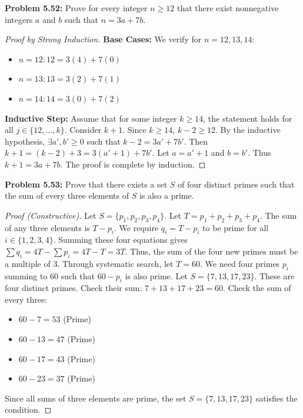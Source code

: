 \documentclass[11pt, a4paper]{article}
\theoremstyle{definition}
\theoremstyle{remark}
\begin{document}
\textbf{Problem 5.52:} Prove for every integer $n \ge 12$ that there exist nonnegative integers $a$ and $b$ such that $n = 3a + 7b$.
\begin{proof}[Proof by Strong Induction]
    \textbf{Base Cases:} We verify for $n=12, 13, 14$:
    \begin{itemize}
        \item $n=12: 12 = 3(4) + 7(0)$
        \item $n=13: 13 = 3(2) + 7(1)$
        \item $n=14: 14 = 3(0) + 7(2)$
    \end{itemize}
    \textbf{Inductive Step:} Assume that for some integer $k \ge 14$, the statement holds for all $j \in \{12, \dots, k\}$. 
    Consider $k+1$. Since $k \ge 14$, $k-2 \ge 12$. By the inductive hypothesis, $\exists a', b' \ge 0$ such that $k-2 = 3a' + 7b'$.
    Then $k+1 = (k-2) + 3 = 3(a'+1) + 7b'$. 
    Let $a = a'+1$ and $b = b'$. Thus $k+1 = 3a+7b$. The proof is complete by induction.
\end{proof}

\textbf{Problem 5.53:} Prove that there exists a set $S$ of four distinct primes such that the sum of every three elements of $S$ is also a prime.
\begin{proof}[Proof (Constructive)]
    Let $S = \{p_1, p_2, p_3, p_4\}$. Let $T = p_1+p_2+p_3+p_4$. The sum of any three elements is $T - p_i$. We require $q_i = T - p_i$ to be prime for all $i \in \{1, 2, 3, 4\}$.
    Summing these four equations gives $\sum q_i = 4T - \sum p_i = 4T - T = 3T$. Thus, the sum of the four new primes must be a multiple of 3.
    Through systematic search, let $T = 60$. We need four primes $p_i$ summing to 60 such that $60 - p_i$ is also prime.
    Let $S = \{7, 13, 17, 23\}$. These are four distinct primes.
    Check their sum: $7 + 13 + 17 + 23 = 60$.
    Check the sum of every three:
    \begin{itemize}
        \item $60 - 7 = 53$ (Prime)
        \item $60 - 13 = 47$ (Prime)
        \item $60 - 17 = 43$ (Prime)
        \item $60 - 23 = 37$ (Prime)
    \end{itemize}
    Since all sums of three elements are prime, the set $S = \{7, 13, 17, 23\}$ satisfies the condition.
\end{proof}
\end{document}
